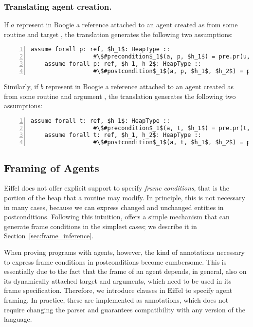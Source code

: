 \subsubsection{Translating agent creation.}
If $a$ represent in Boogie a reference attached to an agent created as  from some routine  and target , the translation generates the following two assumptions:
\begin{lstlisting}[escapechar=\#,numbers=left,language=Boogie]
    assume forall p: ref, $h_1$: HeapType :: 
                  #\$#precondition$_1$(a, p, $h_1$) = pre.pr(u, p, $h_1$);
    assume forall p: ref, $h_1, h_2$: HeapType :: 
                  #\$#postcondition$_1$(a, p, $h_1$, $h_2$) = post.pr(u, p, $h_1$, $h_2$);
\end{lstlisting} 
Similarly, if $b$ represent in Boogie a reference attached to an agent created as  from some routine  and argument , the translation generates the following two assumptions:
\begin{lstlisting}[escapechar=\#,numbers=left,language=Boogie]
    assume forall t: ref, $h_1$: HeapType :: 
                  #\$#precondition$_1$(a, t, $h_1$) = pre.pr(t, v, $h_1$);
    assume forall t: ref, $h_1, h_2$: HeapType :: 
                  #\$#postcondition$_1$(a, t, $h_1$, $h_2$) = post.pr(t, v, $h_1$, $h_2$);
\end{lstlisting} 





\subsection{Framing of Agents} \label{framing}
Eiffel does not offer explicit support to specify \emph{frame conditions}, that is the portion of the heap that a routine may modify.
In principle, this is not necessary in many cases, because we can express changed and unchanged entities in postconditions.
Following this intuition, \AutoProof offers a simple mechanism that can generate frame conditions in the simplest cases; we describe it in Section~\ref{sec:frame_inference}.

When proving programs with agents, however, the kind of annotations necessary to express frame conditions in postconditions become cumbersome.
This is essentially due to the fact that the frame of an agent depends, in general, also on its dynamically attached target and arguments, which need to be used in its frame specification.
Therefore, we introduce  clauses in Eiffel to specify agent framing.
In practice, these are implemented as  annotations, which does not require changing the parser and guarantees compatibility with any version of the language.


